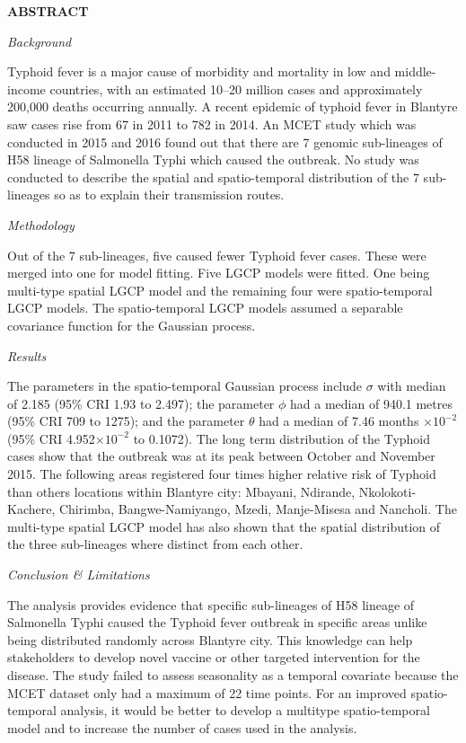 \documentclass[a4paper]{thesis}
\begin{document}
\newpage



\begin{large}
\begin{center}
\bf{ABSTRACT}
\end{center}
\end{large}

\textit{Background}

Typhoid fever is a major cause of morbidity and mortality in low and middle-income countries, with an estimated 10–20 million cases and approximately 200,000 deaths occurring annually. A recent epidemic of typhoid fever in Blantyre saw cases rise from 67 in 2011 to 782 in 2014. An MCET study which was conducted in 2015 and 2016 found out that there are 7 genomic sub-lineages of H58 lineage of Salmonella Typhi which caused the outbreak. No study was conducted to describe the spatial and spatio-temporal distribution of the 7 sub-lineages so as to explain their transmission routes.

\textit{Methodology}

Out of the 7 sub-lineages, five caused fewer Typhoid fever cases. These were merged into one for model fitting. Five LGCP models were fitted. One being multi-type spatial LGCP model and the remaining four were spatio-temporal LGCP models. The spatio-temporal LGCP models assumed a separable covariance function for the Gaussian process.

\textit{Results}

The parameters in the spatio-temporal Gaussian process include $\sigma$ with median of 2.185 (95\% CRI 1.93 to 2.497); the parameter $\phi$ had a median of 940.1 metres (95\% CRI 709 to 1275); and the parameter $\theta$ had a median of 7.46 months $\times10^{-2}$ (95\% CRI 4.952$\times10^{-2}$ to 0.1072). The long term distribution of the Typhoid cases show that the outbreak was at its peak between October and November 2015. The following areas registered four times higher relative risk of Typhoid than others locations within Blantyre city: Mbayani, Ndirande, Nkolokoti-Kachere, Chirimba, Bangwe-Namiyango, Mzedi, Manje-Misesa and Nancholi. The multi-type spatial LGCP model has also shown that the spatial distribution of the three sub-lineages where distinct from each other.

\textit{Conclusion \& Limitations}

The analysis provides evidence that specific sub-lineages of H58 lineage of Salmonella Typhi caused the Typhoid fever outbreak in specific areas unlike being distributed randomly across Blantyre city. This knowledge can help stakeholders to develop novel vaccine or other targeted intervention for the disease. The study failed to assess seasonality as a temporal covariate because the MCET dataset only had a maximum of 22 time points. For an improved spatio-temporal analysis, it would be better to develop a multitype spatio-temporal model and to increase the number of cases used in the analysis.
\end{document}

